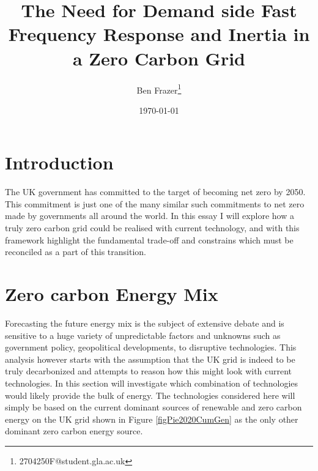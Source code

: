\documentclass[11pt]{article}
\author{Ben Frazer\thanks{2704250F@student.gla.ac.uk}}
\date{\today}
\title{The Need for Demand side Fast Frequency Response and Inertia in a Zero Carbon Grid}
\numberwithin{equation}{section}
\begin{document}
\maketitle
\tableofcontents

\section{Introduction}
\label{sec:orga6a7785}
The UK government has committed to the target of becoming net zero by 2050. This commitment is just one of the many similar such commitments to net zero made by governments all around the world. In this essay I will explore how a truly zero carbon grid could be realised with current technology, and with this framework highlight the fundamental trade-off and constrains which must be reconciled as a part of this transition.
\section{Zero carbon Energy Mix}
\label{sec:org3cb08e6}
Forecasting the future energy mix is the subject of extensive debate and is sensitive to a huge variety of unpredictable factors and unknowns such as government policy, geopolitical developments, to disruptive technologies. This analysis however starts with the assumption that the UK grid is indeed to be truly decarbonized and attempts to reason how this might look with current technologies. In this section will investigate which combination of technologies would likely provide the bulk of energy. The technologies considered here will simply be based on the current dominant sources of renewable and zero carbon energy on the UK grid shown in Figure \ref{figPie2020CumGen} as the only other dominant zero carbon energy source.
\end{document}

